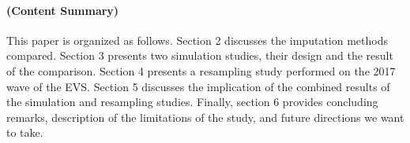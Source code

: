 \paragraph{(Content Summary)}
This paper is organized as follows. 
Section 2 discusses the imputation methods compared.
Section 3 presents two simulation studies, their design and the result of the comparison.
Section 4 presents a resampling study performed on the 2017 wave of the EVS.
Section 5 discusses the implication of the combined results of the simulation and resampling studies.
Finally, section 6 provides concluding remarks, description of the limitations of the study, and  
future directions we want to take.
